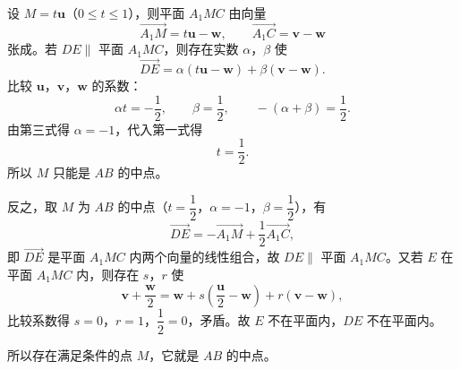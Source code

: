 \begin{answer}
设 $M=t\boldsymbol u$（$0\leqslant t\leqslant 1$），则平面 $A_1MC$ 由向量
\nopagebreak[4]
\[\overrightarrow{A_1M}=t\boldsymbol u-\boldsymbol w,\qquad \overrightarrow{A_1C}=\boldsymbol v-\boldsymbol w\]
张成。若 $DE\parallel$ 平面 $A_1MC$，则存在实数 $\alpha$，$\beta$ 使
\nopagebreak[4]
\[\overrightarrow{DE}=\alpha(t\boldsymbol u-\boldsymbol w)+\beta(\boldsymbol v-\boldsymbol w).\]
比较 $\boldsymbol u$，$\boldsymbol v$，$\boldsymbol w$ 的系数：
\nopagebreak[4]
\[\alpha t=-\frac12,\qquad \beta=\frac12,\qquad -(\alpha+\beta)=\frac12 .\]
由第三式得 $\alpha=-1$，代入第一式得
\nopagebreak[4]
\[t=\frac12 .\]
所以 $M$ 只能是 $AB$ 的中点。

反之，取 $M$ 为 $AB$ 的中点（$t=\dfrac12$，$\alpha=-1$，$\beta=\dfrac12$），有
\nopagebreak[4]
\[\overrightarrow{DE}=-\overrightarrow{A_1M}+\frac12\overrightarrow{A_1C},\]
即 $\overrightarrow{DE}$ 是平面 $A_1MC$ 内两个向量的线性组合，故 $DE\parallel$ 平面 $A_1MC$。又若 $E$ 在平面 $A_1MC$ 内，则存在 $s$，$r$ 使
\nopagebreak[4]
\[\boldsymbol v+\frac{\boldsymbol w}2=\boldsymbol w+s\left(\frac{\boldsymbol u}2-\boldsymbol w\right)+r(\boldsymbol v-\boldsymbol w),\]
比较系数得 $s=0$，$r=1$，$\dfrac12=0$，矛盾。故 $E$ 不在平面内，$DE$ 不在平面内。

所以存在满足条件的点 $M$，它就是 $AB$ 的中点。



\end{answer}
